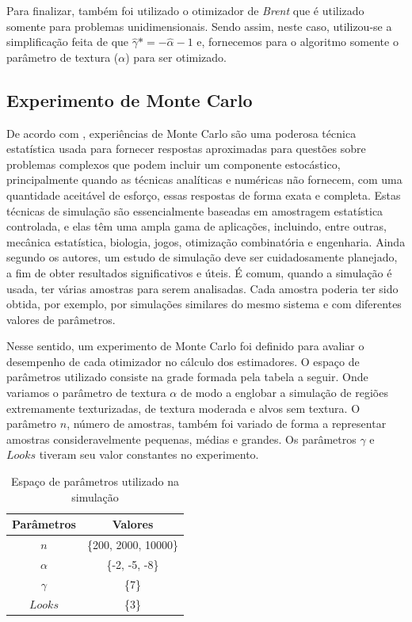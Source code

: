 \documentclass[12pt]{article}
\begin{document}
Para finalizar, também foi utilizado o otimizador de \emph{Brent} que é utilizado somente para problemas unidimensionais. Sendo assim, neste caso, utilizou-se a simplificação feita de que $\widehat{\gamma}* = -\widehat{\alpha} - 1$ e, fornecemos para o algoritmo somente o parâmetro de textura ($\alpha$) para ser otimizado.

\subsection{Experimento de Monte Carlo}

De acordo com \citet{busto92}, experiências de Monte Carlo são uma poderosa técnica estatística usada para fornecer respostas aproximadas para questões sobre problemas complexos que podem incluir um componente estocástico, principalmente quando as técnicas analíticas e numéricas não fornecem, com uma quantidade aceitável de esforço, essas respostas de forma exata e completa. Estas técnicas de simulação são essencialmente baseadas em amostragem estatística controlada, e elas têm uma ampla gama de aplicações, incluindo, entre outras, mecânica estatística, biologia, jogos, otimização combinatória e engenharia. Ainda segundo os autores, um estudo de simulação deve ser cuidadosamente planejado, a fim de obter resultados significativos e úteis. É comum, quando a simulação é usada, ter várias amostras para serem analisadas. Cada amostra poderia ter sido obtida, por exemplo, por simulações similares do mesmo sistema e com diferentes valores de parâmetros.  

Nesse sentido, um experimento de Monte Carlo foi definido para avaliar o desempenho de cada otimizador no cálculo dos estimadores. O espaço de parâmetros utilizado consiste na grade formada pela tabela a seguir. Onde variamos o parâmetro de textura $\alpha$ de modo a englobar a simulação de regiões extremamente texturizadas, de textura moderada e alvos sem textura. O parâmetro $n$, número de amostras, também foi variado de forma a representar amostras consideravelmente pequenas, médias e grandes. Os parâmetros $\gamma$ e $Looks$ tiveram seu valor constantes no experimento.
\begin{table}[H]
\centering
\caption{Espaço de parâmetros utilizado na simulação}
\smallskip
{}
\label{tab:tabela_parameters}
\begin{tabular}{c|c}
\toprule 
\multicolumn{1}{c|}{Parâmetros} & \multicolumn{1}{c}{Valores}  \\ 
\midrule
\rowcolor[gray]{.9} 
$n$ & \{200, 2000, 10000\} \\ \hline
$\alpha$ & \{-2, -5, -8\} \\ \hline
\rowcolor[gray]{.9} $\gamma$ & \{7\} \\ \hline
$Looks$ & \{3\} \\ 
\bottomrule
\end{tabular}
\end{table}
\end{document}

